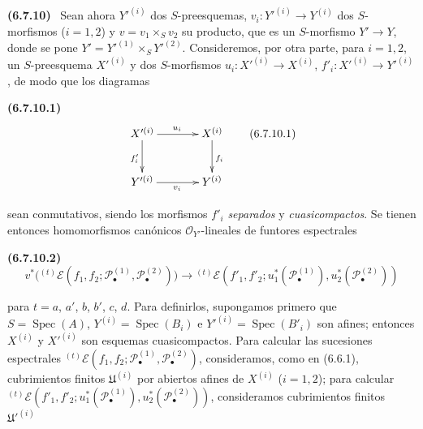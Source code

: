 \documentclass[10pt,oneside]{book}
\newenvironment{env}[1][]{\par\medskip\noindent\textbf{(#1)}\ }{\par}
\begin{document}
\begin{env}[6.7.10]
\label{III.6.7.10}
Sean ahora $Y'^{(i)}$ dos $S$-preesquemas,
$v_i:Y'^{(i)}\to Y^{(i)}$ dos $S$-morfismos ($i=1,2$) y
$v=v_1\times_S v_2$ su producto, que es un $S$-morfismo $Y'\to Y$, donde se
pone $Y'=Y'^{(1)}\times_S Y'^{(2)}$. Consideremos, por otra parte, para
$i=1,2$, un $S$-preesquema $X'^{(i)}$ y dos $S$-morfismos
$u_i:X'^{(i)}\to X^{(i)}$, $f'_i:X'^{(i)}\to Y'^{(i)}$, de modo que los
diagramas
\begin{env}[6.7.10.1]
\label{III.6.7.10.1}
\[
\xymatrix@C=36pt@R=28pt{
  X'^{(i)}\ar[r]^{u_i}\ar[d]_{f'_i}
  & X^{(i)}\ar[d]^{f_i}
  \\
  Y'^{(i)}\ar[r]_{v_i}
  & Y^{(i)}
}
\tag{6.7.10.1}\label{III.6.7.10.1.eq}
\]
\end{env}
sean conmutativos, siendo los morfismos $f'_i$ \emph{separados} y
\emph{cuasicompactos}. Se tienen entonces homomorfismos canónicos
$\mathscr O_{Y'}$-lineales de funtores espectrales
\begin{env}[6.7.10.2]
\label{III.6.7.10.2}
\[
  v^*\bigl({}^{(t)}\mathscr E
  (f_1,f_2;\mathscr P_\bullet^{(1)},\mathscr P_\bullet^{(2)})\bigr)
  \longrightarrow
  {}^{(t)}\mathscr E
  (f'_1,f'_2;u_1^*(\mathscr P_\bullet^{(1)}),
                 u_2^*(\mathscr P_\bullet^{(2)}))
  \tag{6.7.10.2}\label{III.6.7.10.2.eq}
\]
\end{env}
para $t=a$, $a'$, $b$, $b'$, $c$, $d$. Para definirlos, supongamos primero
que $S=\operatorname{Spec}(A)$,
$Y^{(i)}=\operatorname{Spec}(B_i)$ e
$Y'^{(i)}=\operatorname{Spec}(B'_i)$ son afines; entonces $X^{(i)}$ y
$X'^{(i)}$ son esquemas cuasicompactos. Para calcular las sucesiones
espectrales
${}^{(t)}\mathscr E
(f_1,f_2;\mathscr P_\bullet^{(1)},\mathscr P_\bullet^{(2)})$, consideramos,
como en (6.6.1), cubrimientos finitos $\mathfrak U^{(i)}$ por abiertos afines
de $X^{(i)}$ ($i=1,2$); para calcular
${}^{(t)}\mathscr E
(f'_1,f'_2;u_1^*(\mathscr P_\bullet^{(1)}),
u_2^*(\mathscr P_\bullet^{(2)}))$, consideramos cubrimientos finitos
$\mathfrak U'^{(i)}$


\end{env}
\end{document}
